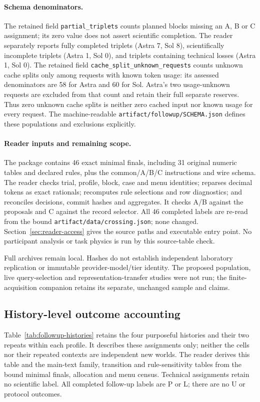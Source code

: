 \paragraph{Schema denominators.}
The retained field \texttt{partial\_triplets} counts planned blocks missing
an A, B or C assignment; its zero value does not assert scientific completion.
The reader separately reports fully completed triplets (Astra 7, Sol 8),
scientifically incomplete triplets (Astra 1, Sol 0), and triplets containing
technical losses (Astra 1, Sol 0). The retained field
\texttt{cache\_split\_unknown\_requests} counts unknown cache splits only
among requests with known token usage: its assessed denominators are
58 for Astra and 60 for Sol. Astra's two usage-unknown requests are excluded
from that count and retain their full separate reserves. Thus zero unknown
cache splits is neither zero cached input nor known usage for every request.
The machine-readable \texttt{artifact/followup/SCHEMA.json} defines these
populations and exclusions explicitly.

\paragraph{Reader inputs and remaining scope.}
The package contains 46 exact minimal finals, including 31 original numeric
tables and declared rules, plus the common/A/B/C instructions and wire schema.
The reader checks trial, profile, block, case and menu identities; reparses
decimal tokens as exact rationals; recomputes rule selections and row diagnostics;
and reconciles decisions, commit hashes and aggregates. It checks A/B against
the proposals and C against the record selector. All 46 completed labels are
re-read from the bound \texttt{artifact/data/crossing.json}; none changed.
Section~\ref{sec:reader-access} gives the source paths and executable entry point. No participant
analysis or task physics is run by this source-table check.

Full archives remain local. Hashes do not establish independent laboratory
replication or immutable provider-model/tier identity. The proposed population,
live query-selection and representation-transfer studies were not run;
the finite-acquisition companion retains its separate, unchanged sample and claims.


\subsection{History-level outcome accounting}
\label{app:followup-history}
Table~\ref{tab:followup-histories} retains the four purposeful histories and
their two repeats within each profile. It describes these assignments only;
neither the cells nor their repeated contexts are independent new worlds.
The reader derives this table and the main-text family, transition and
rule-sensitivity tables from the bound minimal finals, allocation and menu
census. Technical assignments retain no scientific label. All completed
follow-up labels are P or L; there are no U or protocol outcomes.

